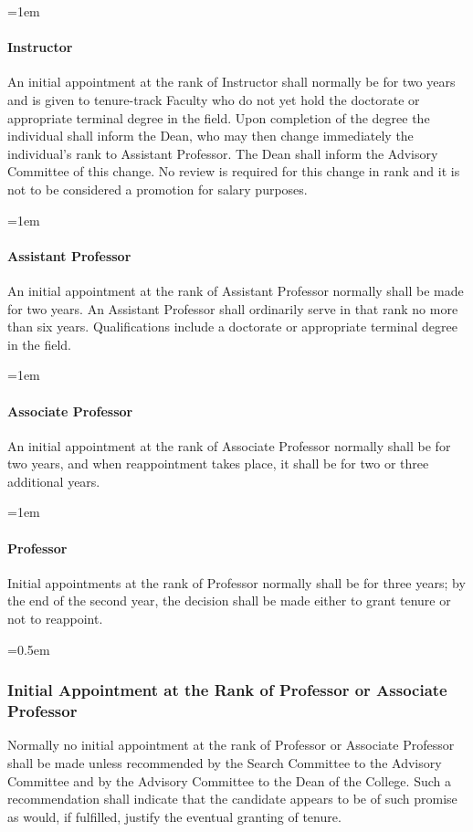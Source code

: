 \documentclass{manual}
\let\oldsubsubsection\subsubsection
\renewcommand\subsubsection{\leftskip=0.5em\oldsubsubsection}
\let\oldparagraph\paragraph
\renewcommand\paragraph{\leftskip=1em\oldparagraph}
\begin{document}
\paragraph{Instructor}
An initial appointment at the rank of Instructor shall normally be for two years and is given to tenure-track Faculty who do not yet hold the doctorate or appropriate terminal degree in the field. Upon completion of the degree the individual shall inform the Dean, who may then change immediately the individual's rank to Assistant Professor. The Dean shall inform the Advisory Committee of this change. No review is required for this change in rank and it is not to be considered a promotion for salary purposes.

\paragraph{Assistant Professor}
An initial appointment at the rank of Assistant Professor normally shall be made for two years. An Assistant Professor shall ordinarily serve in that rank no more than six years. Qualifications include a doctorate or appropriate terminal degree in the field.

\paragraph{Associate Professor}
An initial appointment at the rank of Associate Professor normally shall be for two years, and when reappointment takes place, it shall be for two or three additional years.

\paragraph{Professor}
Initial appointments at the rank of Professor normally shall be for three years; by the end of the second year, the decision shall be made either to grant tenure or not to reappoint.

\subsubsection{Initial Appointment at the Rank of Professor or Associate Professor}
Normally no initial appointment at the rank of Professor or Associate Professor shall be made unless recommended by the Search Committee to the Advisory Committee and by the Advisory Committee to the Dean of the College. Such a recommendation shall indicate that the candidate appears to be of such promise as would, if fulfilled, justify the eventual granting of tenure.
\end{document}

